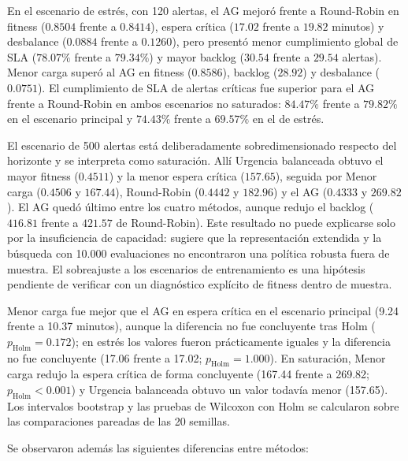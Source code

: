 \documentclass[12pt,a4paper,twocolumn]{article}
\begin{document}
En el escenario de estrés, con 120 alertas, el AG mejoró frente a Round-Robin en fitness ($0.8504$ frente a $0.8414$), espera crítica ($17.02$ frente a $19.82$ minutos) y desbalance ($0.0884$ frente a $0.1260$), pero presentó menor cumplimiento global de SLA ($78.07\%$ frente a $79.34\%$) y mayor backlog ($30.54$ frente a $29.54$ alertas). Menor carga superó al AG en fitness ($0.8586$), backlog ($28.92$) y desbalance ($0.0751$). El cumplimiento de SLA de alertas críticas fue superior para el AG frente a Round-Robin en ambos escenarios no saturados: $84.47\%$ frente a $79.82\%$ en el escenario principal y $74.43\%$ frente a $69.57\%$ en el de estrés.

El escenario de 500 alertas está deliberadamente sobredimensionado respecto del horizonte y se interpreta como saturación. Allí Urgencia balanceada obtuvo el mayor fitness ($0.4511$) y la menor espera crítica ($157.65$), seguida por Menor carga ($0.4506$ y $167.44$), Round-Robin ($0.4442$ y $182.96$) y el AG ($0.4333$ y $269.82$). El AG quedó último entre los cuatro métodos, aunque redujo el backlog ($416.81$ frente a $421.57$ de Round-Robin). Este resultado no puede explicarse solo por la insuficiencia de capacidad: sugiere que la representación extendida y la búsqueda con 10.000 evaluaciones no encontraron una política robusta fuera de muestra. El sobreajuste a los escenarios de entrenamiento es una hipótesis pendiente de verificar con un diagnóstico explícito de fitness dentro de muestra.

Menor carga fue mejor que el AG en espera crítica en el escenario principal (9.24 frente a 10.37 minutos), aunque la diferencia no fue concluyente tras Holm ($p_\mathrm{Holm}=0.172$); en estrés los valores fueron prácticamente iguales y la diferencia no fue concluyente (17.06 frente a 17.02; $p_\mathrm{Holm}=1.000$). En saturación, Menor carga redujo la espera crítica de forma concluyente (167.44 frente a 269.82; $p_\mathrm{Holm}<0.001$) y Urgencia balanceada obtuvo un valor todavía menor (157.65). Los intervalos bootstrap y las pruebas de Wilcoxon con Holm se calcularon sobre las comparaciones pareadas de las 20 semillas.

Se observaron además las siguientes diferencias entre métodos:
\end{document}
